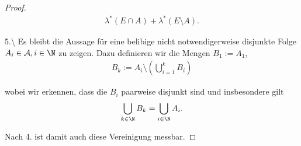\documentclass[letterpaper,10pt,english]{jupyterBook}
\begin{document}
\begin{proof}
\begin{align*}
\lambda^\ast(E\cap A) + \lambda^\ast(E\setminus A).
\end{align*}
\par
5.\textbackslash{} Es bleibt die Aussage für eine belibige nicht notwendigerweise disjunkte Folge \(A_i\in\mathcal{A}, i\in\N\) zu zeigen. Dazu definieren wir die Mengen \(B_1:=A_1\),
\begin{align*}
B_k := A_i\setminus \left(\bigcup_{i=1}^k B_i  \right)
\end{align*}
\par
wobei wir erkennen, dass die \(B_i\) paarweise disjunkt sind und insbesondere gilt
\begin{align*}
\bigcup_{k\in\N} B_k = \bigcup_{i\in\N} A_i.
\end{align*}
\par
Nach 4. ist damit auch diese Vereinigung messbar.
\end{proof}
\end{document}
